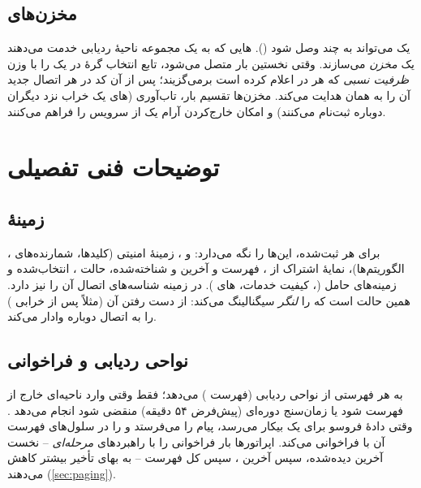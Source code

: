 \documentclass[11pt,a4paper]{article}
\begin{document}
\begin{acnfigure}
  \caption{ساختار  و هویت‌های برگرفته از آن.}
  \label{fig:guti}
\end{acnfigure}

\subsection{مخزن‌های }
یک  می‌تواند به چند  وصل شود (). هایی که به یک مجموعه ناحیهٔ ردیابی خدمت
می‌دهند یک \emph{مخزن} می‌سازند. وقتی  نخستین بار متصل می‌شود، تابع انتخاب گرهٔ  در  یک
 را با وزن \emph{ظرفیت نسبی} که هر  در  اعلام کرده است برمی‌گزیند؛ پس از آن کد 
در  هر اتصال جدید آن  را به همان  هدایت می‌کند. مخزن‌ها تقسیم بار، تاب‌آوری (های یک
 خراب نزد دیگران دوباره ثبت‌نام می‌کنند) و امکان خارج‌کردن آرام یک  از سرویس را فراهم می‌کنند.

\section{توضیحات فنی تفصیلی}

\subsection{زمینهٔ }
برای هر  ثبت‌شده،  این‌ها را نگه می‌دارد:  و ، زمینهٔ امنیتی (کلیدها، شمارنده‌های
، الگوریتم‌ها)، نمایهٔ اشتراک از ، فهرست  و آخرین  و  شناخته‌شده، حالت
،  انتخاب‌شده و زمینه‌های حامل (، کیفیت خدمات، های ). در
 زمینه شناسه‌های  اتصال  آن  را نیز دارد. همین حالت است که  را
\emph{لنگر} سیگنالینگ  می‌کند: از دست رفتن آن (مثلاً پس از خرابی )  را به اتصال دوباره وادار
می‌کند.

\subsection{نواحی ردیابی و فراخوانی}
 به هر  فهرستی از نواحی ردیابی (فهرست ) می‌دهد؛  فقط وقتی وارد ناحیه‌ای خارج از
فهرست شود یا زمان‌سنج دوره‌ای  (پیش‌فرض ۵۴ دقیقه) منقضی شود  انجام می‌دهد \cite{ts24301}. وقتی دادهٔ
فروسو برای یک  بیکار می‌رسد،  پیام  را می‌فرستد و   را در
سلول‌های فهرست  آن با  فراخوانی می‌کند. اپراتورها بار فراخوانی را با راهبردهای \emph{مرحله‌ای} --
نخست آخرین  دیده‌شده، سپس آخرین ، سپس کل فهرست -- به بهای تأخیر بیشتر کاهش می‌دهند (\cref{sec:paging}).
\end{document}
